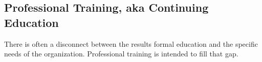 \subsection{Professional Training, aka Continuing Education\label{sec:professional-training}}

There is often a disconnect between the results formal education and the specific needs of the organization. Professional training is intended to fill that gap.  